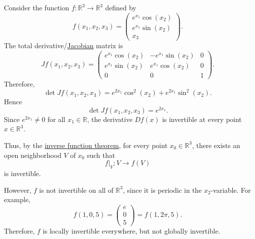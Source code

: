 	\begin{example}
	  \label{ex:a-function-from-r3-to-r3}
		Consider the function $f:\mathbb{R}^3 \to \mathbb{R}^3$
		defined by
		\begin{equation}
			f(x_1,x_2,x_3)
			=
			\begin{pmatrix}
				e^{x_1}\cos(x_2) \\
				e^{x_1}\sin(x_2) \\
				x_3
			\end{pmatrix}.
		\end{equation}
		The total derivative/\hyperref[def:jacobian]{Jacobian} matrix is
		\begin{equation}
			Jf(x_1,x_2,x_3)
			=
			\begin{pmatrix}
				e^{x_1}\cos(x_2) & -e^{x_1}\sin(x_2) & 0 \\
				e^{x_1}\sin(x_2) & e^{x_1}\cos(x_2) & 0 \\
				0 & 0 & 1
			\end{pmatrix}.
		\end{equation}
		Therefore,
		\begin{equation}
			\det Jf(x_1,x_2,x_3)
			=
			e^{2x_1}\cos^2(x_2) + e^{2x_1}\sin^2(x_2).
		\end{equation}
		Hence
		\begin{equation}
			\det Jf(x_1,x_2,x_3)
			=
			e^{2x_1}.
		\end{equation}
		Since $e^{2x_1}\neq 0$ for all $x_1 \in \mathbb{R}$, the derivative
		$Df(x)$ is invertible at every point
		$x\in\mathbb{R}^3$.

		Thus, by the \hyperref[thm:inverse-function-theorem]{inverse function theorem}, for every point
		$x_0 \in \mathbb{R}^3$, there exists an open neighborhood $V$ of
		$x_0$ such that
		\begin{equation}
			f|_V : V \to f(V)
		\end{equation}
		is invertible.

		However, $f$ is not invertible on all of $\mathbb{R}^3$, since it
		is periodic in the $x_2$-variable. For example,
		\begin{equation}
			f(1,0,5)
			=
			\begin{pmatrix}
				e \\
				0 \\
				5
			\end{pmatrix}
			=
			f(1,2\pi,5).
		\end{equation}
		Therefore, $f$ is locally invertible everywhere, but not globally
		invertible.
	\end{example}

